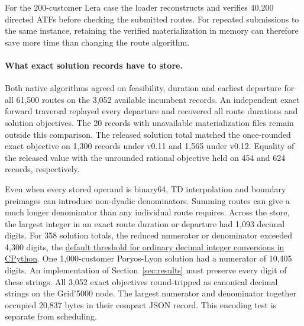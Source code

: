 For the 200-customer Lera case the loader reconstructs and verifies 40,200 directed ATFs before checking the submitted routes. For repeated submissions to the same instance, retaining the verified materialization in memory can therefore save more time than changing the route algorithm.

\paragraph{What exact solution records have to store.}
Both native algorithms agreed on feasibility, duration and earliest departure for all 61,500 routes on the 3,052 available incumbent records. An independent exact forward traversal replayed every departure and recovered all route durations and solution objectives. The 20 records with unavailable materialization files remain outside this comparison. The released solution total matched the once-rounded exact objective on 1,300 records under v0.11 and 1,565 under v0.12. Equality of the released value with the unrounded rational objective held on 454 and 624 records, respectively.

Even when every stored operand is binary64, TD interpolation and boundary preimages can introduce non-dyadic denominators. Summing routes can give a much longer denominator than any individual route requires. Across the store, the largest integer in an exact route duration or departure had 1,093 decimal digits. For 358 solution totals, the reduced numerator or denominator exceeded 4,300 digits, the \href{https://docs.python.org/3.13/library/stdtypes.html#integer-string-conversion-length-limitation}{default threshold for ordinary decimal integer conversions in CPython}. One 1,000-customer Poryos-Lyon solution had a numerator of 10,405 digits. An implementation of Section~\ref{sec:results} must preserve every digit of these strings. All 3,052 exact objectives round-tripped as canonical decimal strings on the Grid'5000 node. The largest numerator and denominator together occupied 20,837 bytes in their compact JSON record. This encoding test is separate from scheduling.
